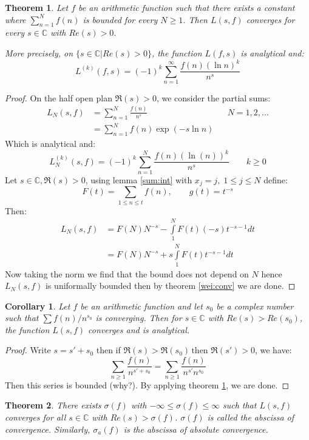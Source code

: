\documentclass[12pt]{article}
\newtheorem{thm}{Theorem}
\newtheorem{cor}{Corollary}
\begin{document}
\begin{thm}\label{series:conv}
Let $f$ be an arithmetic function such that there exists a constant where $\sum_{n=1}^{N} f(n)$ is bounded for every $N \ge 1$. Then $L(s,f)$ converges for every $s \in \mathbb{C}$ with $Re(s) > 0$.

More precisely, on $\{s \in \mathbb{C} | Re(s) > 0\}$, the function $L(f,s)$ is analytical and:
$$
L^{(k)}(f,s) = (-1)^k \sum_{n=1}^{\infty} \frac{f(n)(\ln n)^k}{n^s}
$$
\end{thm}

\begin{proof}
	On the half open plan $\Re(s) > 0$, we consider the partial sums:
	\begin{align*}
		L_N(s,f) &= \sum_{n = 1}^N \frac{f(n)}{n^s}  &&N = 1,2, \dots \\
			 &= \sum_{n = 1}^N f(n) \exp{(-s \ln{n})}
	\end{align*}
	Which is analytical and:
	$$
		L^{(k)}_N (s,f) = (-1)^k \sum_{n = 1}^N \frac{f(n)(\ln(n))^k}{n^s}  \quad\quad k \ge 0
	$$
	Let $s \in \mathbb{C}, \Re(s) > 0$, using lemma \ref{sum:int} with $x_j = j, \; 1 \le j \le N$ define:
	$$
	F(t) = \sum\limits_{1 \le n \le t} f(n), \quad\quad g(t) = t^{-s}
	$$
	Then:
	\begin{align*}
		L_N(s,f) &= F(N) N^{-s} - \int\limits_1^N F(t) (-s) t^{-s-1} dt \\
			 &= F(N) N^{-s} + s \int\limits_1^N F(t) t^{-s-1} dt
	\end{align*}
	Now taking the norm we find that the bound does not depend on $N$ hence $L_N(s,f)$ is uniformally bounded then by theorem \ref{wei:conv} we are done.
\end{proof}

\begin{cor}
	Let $f$ be an arithmetic function and let $s_0$ be a complex number such that $\sum f(n)/n^{s_0}$ is converging. Then for $s \in \mathbb{C}$ with $Re(s) > Re(s_0)$, the function $L(s,f)$ converges and is analytical.
\end{cor}

\begin{proof}
	Write $s = s' + s_0$ then if $\Re(s) > \Re(s_0) \, \text{then } \Re(s') > 0$, we have:
	$$
		\sum\limits_{n \ge 1} \frac{f(n)}{n^{s' + s_0}} = \sum\limits_{n \ge 1} \frac{f(n)}{n^{s'}n^{s_0}}
	$$
	Then this series is bounded (why?). By applying theorem \ref{series:conv}, we are done.
\end{proof}

\begin{thm}
There exists $\sigma(f)$ with $-\infty \le \sigma(f) \le \infty$ such that $L(s,f)$ converges for all $s \in \mathbb{C}$ with $Re(s) > \sigma(f)$. $\sigma(f)$ is called the abscissa of convergence.
Similarly, $\sigma_a(f)$ is the abscissa of absolute convergence.
\end{thm}
\end{document}
